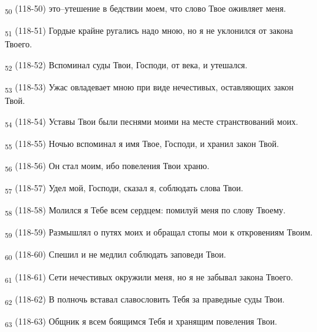 \begin{tcolorbox}
\textsubscript{50} (118-50) это--утешение в бедствии моем, что слово Твое оживляет меня.
\end{tcolorbox}
\begin{tcolorbox}
\textsubscript{51} (118-51) Гордые крайне ругались надо мною, но я не уклонился от закона Твоего.
\end{tcolorbox}
\begin{tcolorbox}
\textsubscript{52} (118-52) Вспоминал суды Твои, Господи, от века, и утешался.
\end{tcolorbox}
\begin{tcolorbox}
\textsubscript{53} (118-53) Ужас овладевает мною при виде нечестивых, оставляющих закон Твой.
\end{tcolorbox}
\begin{tcolorbox}
\textsubscript{54} (118-54) Уставы Твои были песнями моими на месте странствований моих.
\end{tcolorbox}
\begin{tcolorbox}
\textsubscript{55} (118-55) Ночью вспоминал я имя Твое, Господи, и хранил закон Твой.
\end{tcolorbox}
\begin{tcolorbox}
\textsubscript{56} (118-56) Он стал моим, ибо повеления Твои храню.
\end{tcolorbox}
\begin{tcolorbox}
\textsubscript{57} (118-57) Удел мой, Господи, сказал я, соблюдать слова Твои.
\end{tcolorbox}
\begin{tcolorbox}
\textsubscript{58} (118-58) Молился я Тебе всем сердцем: помилуй меня по слову Твоему.
\end{tcolorbox}
\begin{tcolorbox}
\textsubscript{59} (118-59) Размышлял о путях моих и обращал стопы мои к откровениям Твоим.
\end{tcolorbox}
\begin{tcolorbox}
\textsubscript{60} (118-60) Спешил и не медлил соблюдать заповеди Твои.
\end{tcolorbox}
\begin{tcolorbox}
\textsubscript{61} (118-61) Сети нечестивых окружили меня, но я не забывал закона Твоего.
\end{tcolorbox}
\begin{tcolorbox}
\textsubscript{62} (118-62) В полночь вставал славословить Тебя за праведные суды Твои.
\end{tcolorbox}
\begin{tcolorbox}
\textsubscript{63} (118-63) Общник я всем боящимся Тебя и хранящим повеления Твои.
\end{tcolorbox}
